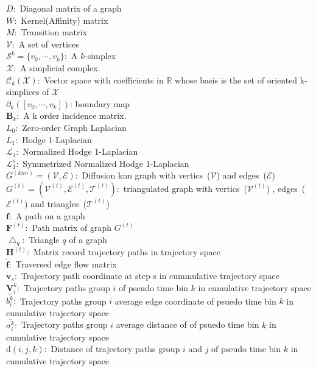 $D: $ Diagonal matrix of a graph\\
$W: $ Kernel(Affinity) matrix \\
$M: $ Transition matrix \\
$\mathcal{V}: $ A set of vertices\\
$\mathcal{S}^k = \{{v}_0,\cdots,{v}_k \}: $ A $k$-simplex\\
$\mathcal{X}: $ A simplicial complex.\\
$\mathcal{C}_k(\mathcal{X}): $ Vector space with coefficients in $\mathbb{R}$ whose basis is the set of oriented k-simplices of $\mathcal{X}$\\
$\partial_k ([v_0,\cdots, v_k])$: boundary map\\
$\mathbf{B}_k: $ A k order incidence matrix.\\
$L_0: $ Zero-order Graph Laplacian\\
$L_1: $ Hodge 1-Laplacian\\
$\mathcal{L}_1: $ Normalized Hodge 1-Laplacian\\
$\mathcal{L}_1^s: $ Symmetrized Normalized Hodge 1-Laplacian\\
$G^{(knn)} = (\mathcal{V}, \mathcal{E}): $ Diffusion knn graph with vertics~($\mathcal{V}$) and edges~($\mathcal{E}$) \\
$G^{(t)} = (\mathcal{V}^{(t)} , \mathcal{E}^{(t)} , \mathcal{T}^{(t)}): $ triangulated graph with vertics~($\mathcal{V}^{(t)}$) , edges~($\mathcal{E}^{(t)}$) and triangles~($\mathcal{T}^{(t)}$)\\
$\mathbf{f}: $ A path on a graph\\
$\mathbf{F}^(t): $ Path matrix of graph $G^{(t)}$ \\
$\bigtriangleup_{q}: $ Triangle $q$ of a graph\\
$\mathbf{H}^{(t)}: $ Matrix record trajectory paths in trajectory space \\
$\hat{\mathbf{f}}: $ Traversed edge flow matrix \\
$\mathbf{v}_s: $ Trajectory path coordinate at step s in cummulative trajectory space \\
$\mathbf{V}^k_i: $ Trajectory paths group $i$ of pseudo time bin $k$ in cumulative trajectory space \\
$\overline{b^k_i}: $ Trajectory paths group $i$ average edge coordinate of psuedo time bin $k$ in cumulative trajectory space \\
$\overline{\sigma^k_i}: $  Trajectory paths group $i$ average distance of of psuedo time bin $k$ in cumulative trajectory space \\
$\mathrm{d}(i,j,k): $ Distance of trajectory paths group $i$ and $j$ of pseudo time bin $k$ in cumulative trajectory space \\
